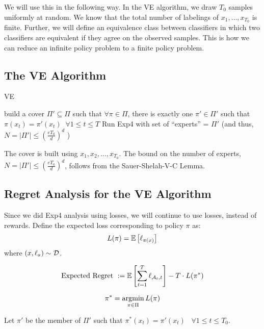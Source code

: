 \documentclass[11pt]{article}
\begin{document}
We will use this in the following way. In the VE algorithm, we draw $T_0$ samples uniformly at random. We know that the total number of labelings of $x_1,\ldots,x_{T_0}$ is finite. Further, we will define an equivalence class between classifiers in which two classifiers are equivalent if they agree on the observed samples. This is how we can reduce an infinite policy problem to a finite policy problem. 


\subsection{The VE Algorithm}

\begin{algorithm}
\caption{VE}
\label{alg: VE}
\begin{algorithmic}
\ENDFOR
\STATE build a cover  $\Pi' \subseteq \Pi$ such that $\forall \pi \in \Pi$, there is exactly one $\pi' \in \Pi'$ such that $\pi(x_t) = \pi'(x_t)\;\;\forall 1 \le t \le T$
\STATE Run Exp4 with set of ``experts'' = $\Pi'$ (and thus,  $N = |\Pi'| \le (\frac{eT_0}{d})^d$ )
\ENDFOR
\end{algorithmic}
\end{algorithm}
The cover is built using $x_1,x_2,\ldots,x_{T_0}$. The bound on the number of experts, $N= |\Pi'| \le (\frac{eT_0}{d})^d$, follows from the Sauer-Shelah-V-C Lemma. 

%
%
\subsection{Regret Analysis for the VE Algorithm}

Since we did Exp4 analysis using losses, we will continue to use losses, instead of rewards.
Define the expected loss corresponding to policy $\pi$ as:
\begin{equation}
L(\pi) = \mathbb{E}\left[ \ell_{\pi(x)} \right]
\end{equation}
where ${(x,\ell_a)\sim \mathcal{D}}$.

\begin{equation}
\text{Expected Regret }:= \mathbb{E}\left[ \sum_{t=1}^T\ell_{\mathcal{A}_t,t} \right] - T\cdot L(\pi^*)
\end{equation}

$$\pi^*=\operatorname*{argmin}_{\pi\in\Pi} L(\pi)$$

Let $\pi'$ be the member of $\Pi'$ such that $\pi^*(x_t) = \pi'(x_t)\;\;\;\forall 1\le t \le T_0$.
\end{document}
